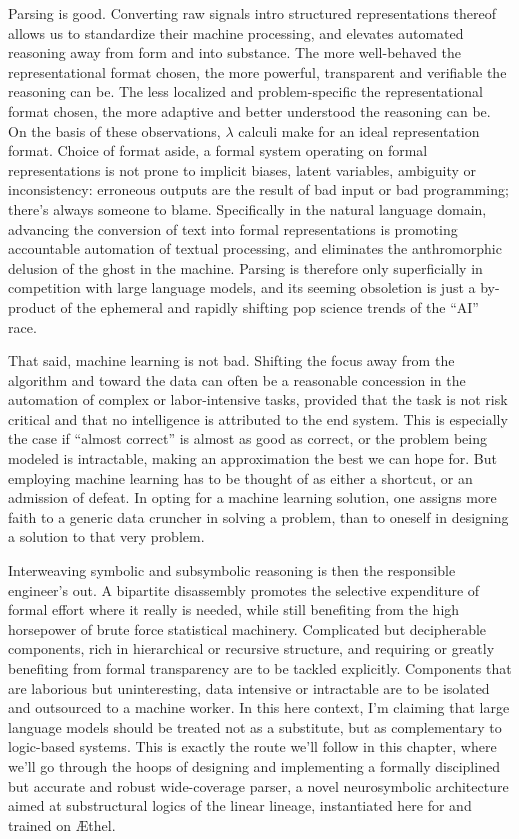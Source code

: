 Parsing is good.
Converting raw signals intro structured representations thereof allows us to standardize their machine processing, and elevates automated reasoning away from form and into substance.
The more well-behaved the representational format chosen, the more powerful, transparent and verifiable the reasoning can be.
The less localized and problem-specific the representational format chosen, the more adaptive and better understood the reasoning can be.
On the basis of these observations, $\lambda$ calculi make for an ideal representation format.
Choice of format aside, a formal system operating on formal representations is not prone to implicit biases, latent variables, ambiguity or inconsistency: erroneous outputs are the result of bad input or bad programming; there's always someone to blame.
Specifically in the natural language domain, advancing the conversion of text into formal representations is promoting accountable automation of textual processing, and eliminates the anthromorphic delusion of the ghost in the machine.
Parsing is therefore only superficially in competition with large language models, and its seeming obsoletion is just a by-product of the ephemeral and rapidly shifting pop science trends of the ``AI'' race.

That said, machine learning is not bad.
Shifting the focus away from the algorithm and toward the data can often be a reasonable concession in the automation of complex or labor-intensive tasks, provided that the task is not risk critical and that no intelligence is attributed to the end system.
This is especially the case if ``almost correct'' is almost as good as correct, or the problem being modeled is intractable, making an approximation the best we can hope for.
But employing machine learning has to be thought of as either a shortcut, or an admission of defeat.
In opting for a machine learning solution, one assigns more faith to a generic data cruncher in solving a problem, than to oneself in designing a solution to that very problem.

Interweaving symbolic and subsymbolic reasoning is then the responsible engineer's out.
A bipartite disassembly promotes the selective expenditure of formal effort where it really is needed, while still benefiting from the high horsepower of brute force statistical machinery.
Complicated but decipherable components, rich in hierarchical or recursive structure, and requiring or greatly benefiting from formal transparency are to be tackled explicitly.
Components that are laborious but uninteresting, data intensive or intractable are to be isolated and outsourced to a machine worker.
In this here context, I'm claiming that large language models should be treated not as a substitute, but as complementary to logic-based systems.
This is exactly the route we'll follow in this chapter, where we'll go through the hoops of designing and implementing a formally disciplined but accurate and robust wide-coverage parser, a novel neurosymbolic architecture aimed at substructural logics of the linear lineage, instantiated here for \NLPplus{} and trained on \AE thel.

